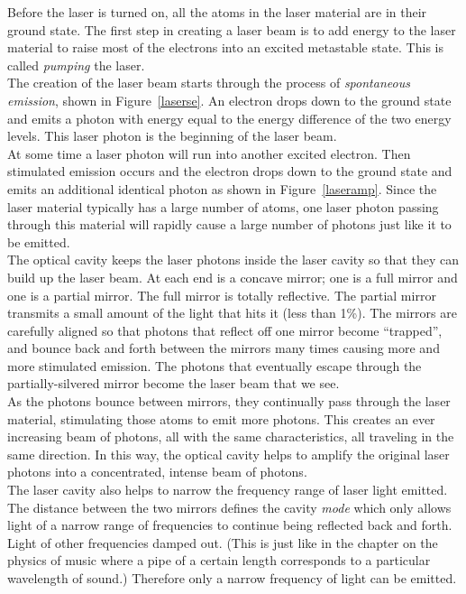 Before the laser is turned on, all the atoms in the laser material are in their ground state. The first step in creating a laser beam is to add energy to the laser material to raise most of the electrons into an excited metastable state. This is called \textit{pumping} the laser. \\ 

The creation of the laser beam starts through the process of \textit{spontaneous emission}, shown in Figure~\ref{laserse}. An electron drops down to the ground state and emits a photon with energy equal to the energy difference of the two energy levels. This laser photon is the beginning of the laser beam.\\

At some time a laser photon will run into another excited electron. Then stimulated emission occurs and the electron drops down to the ground state and emits an additional identical photon as shown in Figure~\ref{laseramp}. Since the laser material typically has a large number of atoms, one laser photon passing through this material will rapidly cause a large number of photons just like it to be emitted.\\
 
The optical cavity keeps the laser photons inside the laser cavity so that they can build up the laser beam. At each end is a concave mirror; one is a full mirror and one is a partial mirror. The full mirror is totally reflective. The partial mirror transmits a small amount of the light that hits it (less than 1\%). The mirrors are carefully aligned so that photons that reflect off one mirror become ``trapped'', and bounce back and forth between the mirrors many times causing more and more stimulated emission. The photons that eventually escape through the partially-silvered mirror become the laser beam that we see.\\
 
As the photons bounce between mirrors, they continually pass through the laser material, stimulating those atoms to emit more photons.  This creates an ever increasing beam of photons, all with the same characteristics, all traveling in the same direction.  In this way, the optical cavity helps to amplify the original laser photons into a concentrated, intense beam of photons.\\

The laser cavity also helps to narrow the frequency range of laser light emitted. The distance between the two mirrors defines the cavity \textit{mode} which only allows light of a narrow range of frequencies to continue being reflected back and forth. Light of other frequencies damped out. (This is just like in the chapter on the physics of music where a pipe of a certain length corresponds to a particular wavelength of sound.) Therefore only a narrow frequency of light can be emitted.


